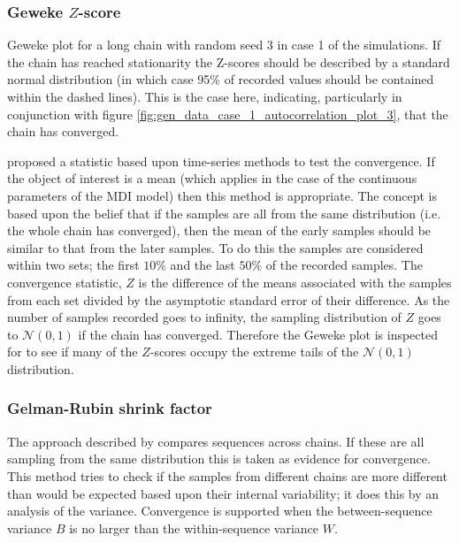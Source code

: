 \documentclass[12pt]{article} %
\begin{document}
	\subsubsection{Geweke $Z$-score} \label{sec:additional_theory:sub_sec:convergence:sub_sub_sec:geweke}
	Geweke plot \citep{GewekeEvaluatingAccuracySamplingBased} for a long chain with random seed 3 in case 1 of the simulations. If the chain has reached stationarity the Z-scores should be described by a standard normal distribution (in which case 95\% of recorded values should be contained within the dashed lines). This is the case here, indicating, particularly in conjunction with figure \ref{fig:gen_data_case_1_autocorrelation_plot_3}, that the chain has converged.
	
	\citet{GewekeEvaluatingAccuracySamplingBased} proposed a statistic based upon time-series methods to test the convergence. If the object of interest is a mean (which applies in the case of the continuous parameters of the MDI model) then this method is appropriate. The concept is based upon the belief that if the samples are all from the same distribution (i.e. the whole chain has converged), then the mean of the early samples should be similar to that from the later samples. To do this the samples are considered within two sets; the first $10\%$ and the last $50\%$ of the recorded samples.  The convergence statistic, $Z$ is the difference of the means associated with the samples from each set divided by the asymptotic standard error of their difference. As the number of samples recorded goes to infinity, the sampling distribution of $Z$ goes to $\mathcal{N}(0,1)$ if the chain has converged. Therefore the Geweke plot is inspected for to see if many of the $Z$-scores occupy the extreme tails of the $\mathcal{N}(0,1)$ distribution.
	
	\subsubsection{Gelman-Rubin shrink factor}
	\label{sec:additional_theory:sub_sec:convergence:sub_sub_sec:gelman}
	The approach described by \citet{GelmanInferenceIterativeSimulation1992} compares sequences across chains. If these are all sampling from the same distribution this is taken as evidence for convergence. This method tries to check if the samples from different chains are more different than would be expected based upon their internal variability; it does this by an analysis of the variance. Convergence is supported when the between-sequence variance $B$ is no larger than the within-sequence variance $W$.
	
\end{document}
